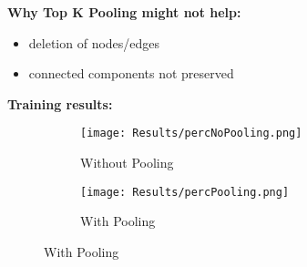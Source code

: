 \vspace*{-0.3cm}
\textbf{Why Top K Pooling might not help:} 
\begin{itemize}
    \item deletion of nodes/edges
    \item connected components not preserved
\end{itemize}
\textbf{Training results:}
\begin{figure}[h]
    \centering
    \begin{subfigure}[t]{0.45\textwidth}
        \centering
        \texttt{[image: Results/percNoPooling.png]}
        \caption{Without Pooling}
    \end{subfigure}
    \hfill
    \begin{subfigure}[t]{0.45\textwidth}
        \centering
        \texttt{[image: Results/percPooling.png]}
        \caption{With Pooling}
    \end{subfigure}
\end{figure}